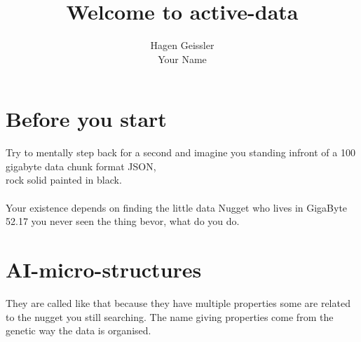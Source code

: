 \documentclass[11pt]{article}
\title{\textbf{Welcome to active-data}}
\author{Hagen Geissler\\
		Your Name}
\date{}
\begin{document}
\maketitle

\section{Before you start}

Try to mentally step back for a second and imagine you standing infront of a 100 gigabyte data chunk format JSON,\\
rock solid painted in black.\\\\
Your existence depends on finding the little data Nugget who lives in GigaByte 52.17
you never seen the thing bevor,
what do you do.



\section{AI-micro-structures}
They are called like that because they have multiple properties some are related to the nugget you still searching. The name giving properties come from the genetic way the data is organised.
\end{document}
